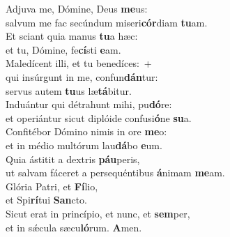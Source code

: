 \oddverse Adjuva me, Dómine, Deus \textbf{me}us:~\*\\
\oddverse salvum me fac secúndum miseri\textbf{cór}diam \textbf{tu}am.\\
\evenverse Et sciant quia manus \textbf{tu}a hæc:~\*\\
\evenverse et tu, Dómine, fe\textbf{cí}sti \textbf{e}am.\\
\oddverse Maledícent illi, et tu benedíces:~+\\
\oddverse  qui insúrgunt in me, confun\textbf{dán}tur:~\*\\
\oddverse servus autem \textbf{tu}us læ\textbf{tá}bitur.\\
\evenverse Induántur qui détrahunt mihi, pu\textbf{dó}re:~\*\\
\evenverse et operiántur sicut diplóide confusi\textbf{ó}ne \textbf{su}a.\\
\oddverse Confitébor Dómino nimis in ore \textbf{me}o:~\*\\
\oddverse et in médio multórum lau\textbf{dá}bo \textbf{e}um.\\
\evenverse Quia ástitit a dextris \textbf{páu}peris,~\*\\
\evenverse ut salvam fáceret a persequéntibus \textbf{á}nimam \textbf{me}am.\\
\oddverse Glória Patri, et \textbf{Fí}lio,~\*\\
\oddverse et Spi\textbf{rí}tui \textbf{San}cto.\\
\evenverse Sicut erat in princípio, et nunc, et \textbf{sem}per,~\*\\
\evenverse et in sǽcula sæcu\textbf{ló}rum. \textbf{A}men.\\

